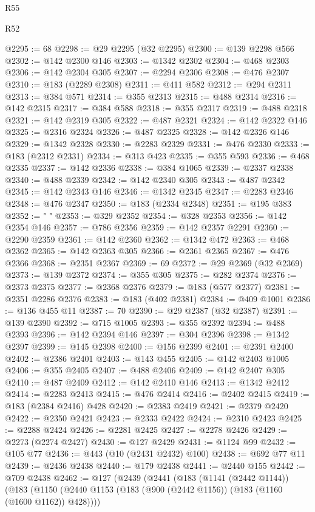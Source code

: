 \begin{lexlean}{R55}
\begin{lexlean}{R52}
\begin{coremodule}
{{{{{{{{{{{{{{{{{{{{{{{{{{{{{{{{{{{{{{{{{{{{{{{{{{{{{{{{{{{{{{{{{{{{{{{{{{{{{{{{{{{{{{{{{{{{{{{{{{{{{{{{{{{{{{{{{{{{{{{{{{{{{{{{{{{{{{{{{{{{{{{{{{{{{{{{{{{{{{{{{{{{{{{{{{{{{{{{{{{{{{{{{{{{{{{{{{{{{{@2295 := 68
@2298 := @29 @2295 (@32 @2295)
@2300 := @139 @2298 @566
@2302 := @142 @2300 @146
@2303 := @1342 @2302
@2304 := @468 @2303
@2306 := @142 @2304 @305
@2307 := @2294 @2306
@2308 := @476 @2307
@2310 := @183 (@2289 @2308)
@2311 := @411 @582
@2312 := @294 @2311
@2313 := @384 @571
@2314 := @355 @2313
@2315 := @488 @2314
@2316 := @142 @2315
@2317 := @384 @588
@2318 := @355 @2317
@2319 := @488 @2318
@2321 := @142 @2319 @305
@2322 := @487 @2321
@2324 := @142 @2322 @146
@2325 := @2316 @2324
@2326 := @487 @2325
@2328 := @142 @2326 @146
@2329 := @1342 @2328
@2330 := @2283 @2329
@2331 := @476 @2330
@2333 := @183 (@2312 @2331)
@2334 := @313 @423
@2335 := @355 @593
@2336 := @468 @2335
@2337 := @142 @2336
@2338 := @384 @1065
@2339 := @2337 @2338
@2340 := @488 @2339
@2342 := @142 @2340 @305
@2343 := @487 @2342
@2345 := @142 @2343 @146
@2346 := @1342 @2345
@2347 := @2283 @2346
@2348 := @476 @2347
@2350 := @183 (@2334 @2348)
@2351 := @195 @383
@2352 := " "
@2353 := @329 @2352
@2354 := @328 @2353
@2356 := @142 @2354 @146
@2357 := @786 @2356
@2359 := @142 @2357 @2291
@2360 := @2290 @2359
@2361 := @142 @2360
@2362 := @1342 @472
@2363 := @468 @2362
@2365 := @142 @2363 @305
@2366 := @2361 @2365
@2367 := @476 @2366
@2368 := @2351 @2367
@2369 := 69
@2372 := @29 @2369 (@32 @2369)
@2373 := @139 @2372
@2374 := @355 @305
@2375 := @282 @2374
@2376 := @2373 @2375
@2377 := @2368 @2376
@2379 := @183 (@577 @2377)
@2381 := @2351 @2286 @2376
@2383 := @183 (@402 @2381)
@2384 := @409 @1001
@2386 := @136 @455 @11
@2387 := 70
@2390 := @29 @2387 (@32 @2387)
@2391 := @139 @2390
@2392 := @715 @1005
@2393 := @355 @2392
@2394 := @488 @2393
@2396 := @142 @2394 @146
@2397 := @304 @2396
@2398 := @1342 @2397
@2399 := @145 @2398
@2400 := @156 @2399
@2401 := @2391 @2400
@2402 := @2386 @2401
@2403 := @143 @455
@2405 := @142 @2403 @1005
@2406 := @355 @2405
@2407 := @488 @2406
@2409 := @142 @2407 @305
@2410 := @487 @2409
@2412 := @142 @2410 @146
@2413 := @1342 @2412
@2414 := @2283 @2413
@2415 := @476 @2414
@2416 := @2402 @2415
@2419 := @183 (@2384 @2416) @428
@2420 := @2383 @2419
@2421 := @2379 @2420
@2422 := @2350 @2421
@2423 := @2333 @2422
@2424 := @2310 @2423
@2425 := @2288 @2424
@2426 := @2281 @2425
@2427 := @2278 @2426
@2429 := @2273 (@2274 @2427)
@2430 := @127 @2429
@2431 := @1124 @99
@2432 := @105 @77
@2436 := @443 (@10 (@2431 @2432) @100)
@2438 := @692 @77 @11
@2439 := @2436 @2438
@2440 := @179 @2438
@2441 := @2440 @155
@2442 := @709 @2438
@2462 := @127
    (@2439
      (@2441
        (@183
          (@1141 (@2442 @1144))
          (@183
            (@1150 (@2440 @1153 (@183 (@900 (@2442 @1156)) (@183 (@1160 (@1600 @1162)) @428))))
}}}}}}}}}}}}}}}}}}}}}}}}}}}}}}}}}}}}}}}}}}}}}}}}}}}}}}}}}}}}}}}}}}}}}}}}}}}}}}}}}}}}}}}}}}}}}}}}}}}}}}}}}}}}}}}}}}}}}}}}}}}}}}}}}}}}}}}}}}}}}}}}}}}}}}}}}}}}}}}}}}}}}}}}}}}}}}}}}}}}}}}}}}}}}}}}}}}}}}
\end{coremodule}
\end{lexlean}
\end{lexlean}
